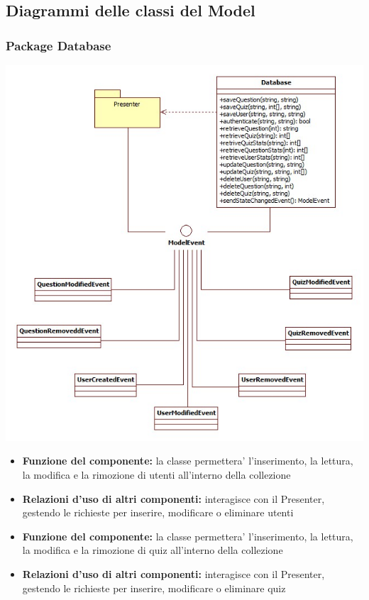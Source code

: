 \subsection{Diagrammi delle classi del Model}
			\subsubsection{Package Database}
			\begin{center}
				\includegraphics[scale=0.6]{../images/Database.jpg}
			\end{center}
 			\begin{itemize}
		    	\item\textbf{Funzione del componente:} la classe permettera' l'inserimento, la lettura, la modifica e la rimozione di utenti all'interno della collezione
			\item\textbf{Relazioni d'uso di altri componenti:} interagisce con il Presenter, gestendo le richieste per inserire, modificare o eliminare utenti

			\end{itemize}
			\begin{itemize}
		    	\item\textbf{Funzione del componente:} la classe permettera' l'inserimento, la lettura, la modifica e la rimozione di quiz all'interno della collezione
			\item\textbf{Relazioni d'uso di altri componenti:} interagisce con il Presenter, gestendo le richieste per inserire, modificare o eliminare quiz
			\end{itemize}
